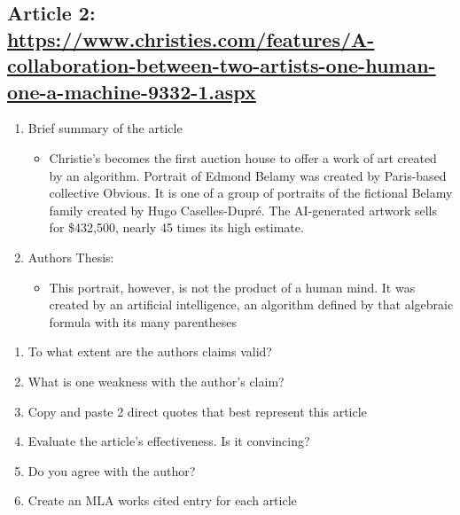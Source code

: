 \documentclass{scrartcl}
\begin{document}
\subsection{Article 2:  \url{https://www.christies.com/features/A-collaboration-between-two-artists-one-human-one-a-machine-9332-1.aspx}}
\label{sec:orgd80bbaf}
\begin{enumerate}
\item Brief summary of the article
\begin{itemize}
\item Christie's becomes the first auction house to offer a work of art created by an algorithm. Portrait of Edmond Belamy was created by Paris-based
collective Obvious. It is one of a group of portraits of the fictional
Belamy family created by Hugo Caselles-Dupré. The AI-generated artwork
sells for \$432,500, nearly 45 times its high estimate.
\end{itemize}

\item Authors Thesis:
\begin{itemize}
\item This portrait, however, is not the product of a human mind. It was created by an artificial intelligence, an algorithm defined by that algebraic formula with its many parentheses
\end{itemize}
\end{enumerate}
\begin{enumerate}
\item To what extent are the authors claims valid?
\item What is one weakness with the author's claim?
\item Copy and paste 2 direct quotes that best represent this article
\item Evaluate the article's effectiveness. Is it convincing?
\item Do you agree with the author?
\item Create an MLA works cited entry for each article
\end{enumerate}
\end{document}
